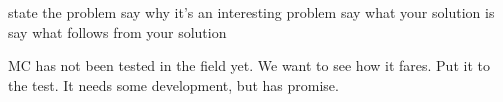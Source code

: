 state the problem
say why it's an interesting problem
say what your solution is
say what follows from your solution

MC has not been tested in the field yet.
We want to see how it fares.
Put it to the test.
It needs some development, but has promise.
